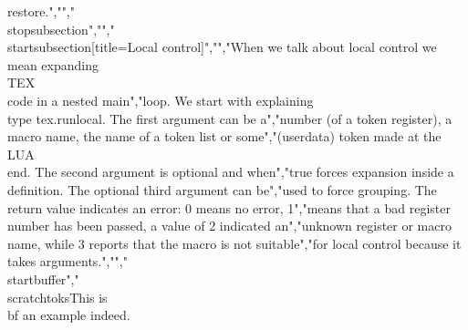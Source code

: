restore.","","\\stopsubsection","","\\startsubsection[title=Local control]","","When we talk about local control we mean expanding \\TEX\\ code in a nested main","loop. We start with explaining \\type {tex.runlocal}. The first argument can be a","number (of a token register), a macro name, the name of a token list or some","(userdata) token made at the \\LUA\\ end. The second argument is optional and when","true forces expansion inside a definition. The optional third argument can be","used to force grouping. The return value indicates an error: 0 means no error, 1","means that a bad register number has been passed, a value of 2 indicated an","unknown register or macro name, while 3 reports that the macro is not suitable","for local control because it takes arguments.","","\\startbuffer","\\scratchtoks{This is {\\bf an example} indeed.}%
